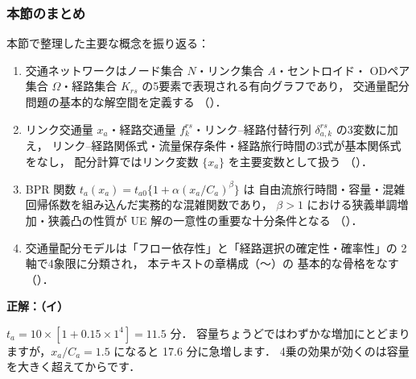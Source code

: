\subsubsection*{本節のまとめ}

本節で整理した主要な概念を振り返る：
\begin{enumerate}
  \item 交通ネットワークはノード集合 $N$・リンク集合 $A$・セントロイド・
        ODペア集合 $\Omega$・経路集合 $K_{rs}$ の5要素で表現される有向グラフであり，
        交通量配分問題の基本的な解空間を定義する
        （）．
  \item リンク交通量 $x_a$・経路交通量 $f_k^{rs}$・リンク–経路付替行列
        $\delta_{a,k}^{rs}$ の3変数に加え，
        リンク–経路関係式・流量保存条件・経路旅行時間の3式が基本関係式をなし，
        配分計算ではリンク変数 $\{x_a\}$ を主要変数として扱う
        （）．
  \item BPR 関数 $t_a(x_a) = t_{a0}\{1 + \alpha(x_a/C_a)^\beta\}$ は
        自由流旅行時間・容量・混雑回帰係数を組み込んだ実務的な混雑関数であり，
        $\beta > 1$ における狭義単調増加・狭義凸の性質が
        UE 解の一意性の重要な十分条件となる
        （）．
  \item 交通量配分モデルは「フロー依存性」と「経路選択の確定性・確率性」の
        2軸で4象限に分類され，
        本テキストの章構成（〜）の
        基本的な骨格をなす
        （）．
\end{enumerate}

\begin{example}[title={クイズ 1 正解・解説}]
\label{ans:q1}
\textbf{正解：（イ）}

$t_a=10\times[1+0.15\times 1^4]=11.5$ 分．
容量ちょうどではわずかな増加にとどまりますが，$x_a/C_a=1.5$ になると 17.6 分に急増します．
4乗の効果が効くのは容量を大きく超えてからです．
\end{example}
